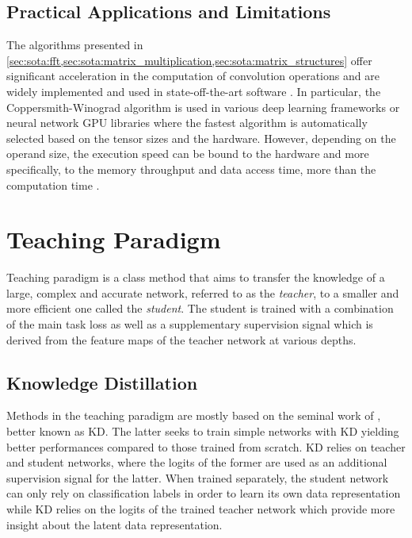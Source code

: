 \subsection{Practical Applications and Limitations}
The algorithms presented in
\cref{sec:sota:fft,sec:sota:matrix_multiplication,sec:sota:matrix_structures}
offer significant acceleration in the computation of convolution operations and
are widely implemented and used in state-off-the-art software
\cite{pytorch_vision,DBLP:journals/corr/AbadiABBCCCDDDG16}. In particular, the
Coppersmith-Winograd algorithm is used in various deep learning frameworks
\cite{DBLP:journals/corr/AbadiABBCCCDDDG16,DBLP:conf/nips/PaszkeGMLBCKLGA19} or
neural network \ac{GPU} libraries \cite{nvidia_cudnn} where the fastest
algorithm is automatically selected based on the tensor sizes and the hardware.
However, depending on the operand size, the execution speed can be bound to the
hardware and more specifically, to the memory throughput and data access time,
more than the computation time
\cite{DBLP:journals/pc/WhaleyPD01,DBLP:journals/cca/DrevetIS10}.\\

\section{Teaching Paradigm}\label{sec:sota:teaching_paradigm}

Teaching paradigm is a class method that aims to transfer the knowledge of a
large, complex and accurate network, referred to as the \emph{teacher}, to a
smaller and more efficient one called the \emph{student}. The student is trained
with a combination of the main task loss as well as a supplementary supervision
signal which is derived from the feature maps of the teacher network at various
depths.\\


\subsection{Knowledge Distillation}
Methods in the teaching paradigm are mostly based on the seminal work of
\citeauthor{DBLP:journals/corr/HintonVD15} \cite{DBLP:journals/corr/HintonVD15},
better known as \acf{KD}. The latter seeks to train simple networks with \ac{KD}
yielding better performances compared to those trained from scratch. \ac{KD}
relies on teacher and student networks, where the logits of the former are used
as an additional supervision signal for the latter. When trained separately, the
student network can only rely on classification labels in order to learn its own
data representation while \ac{KD} relies on the logits of the trained teacher
network which provide more insight about the latent data representation.\\


